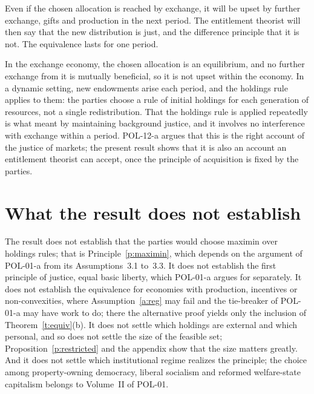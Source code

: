 \documentclass{situationist-preprint}
\begin{document}
\begin{objection}
Even if the chosen allocation is reached by exchange, it will be upset by further exchange, gifts and production in the next period. The entitlement theorist will then say that the new distribution is just, and the difference principle that it is not. The equivalence lasts for one period.
\end{objection}

\begin{reply}
In the exchange economy, the chosen allocation is an equilibrium, and no further exchange from it is mutually beneficial, so it is not upset within the economy. In a dynamic setting, new endowments arise each period, and the holdings rule applies to them: the parties choose a rule of initial holdings for each generation of resources, not a single redistribution. That the holdings rule is applied repeatedly is what \citet{Rawls1977} meant by maintaining background justice, and it involves no interference with exchange within a period. POL-12-a argues that this is the right account of the justice of markets; the present result shows that it is also an account an entitlement theorist can accept, once the principle of acquisition is fixed by the parties.
\end{reply}

\section{What the result does not establish}\label{s:not}

The result does not establish that the parties would choose maximin over holdings rules; that is Principle~\ref{p:maximin}, which depends on the argument of POL-01-a from its Assumptions~3.1 to~3.3. It does not establish the first principle of justice, equal basic liberty, which POL-01-a argues for separately. It does not establish the equivalence for economies with production, incentives or non-convexities, where Assumption~\ref{a:reg} may fail and the tie-breaker of POL-01-a may have work to do; there the alternative proof yields only the inclusion of Theorem~\ref{t:equiv}(b). It does not settle which holdings are external and which personal, and so does not settle the size of the feasible set; Proposition~\ref{p:restricted} and the appendix show that the size matters greatly. And it does not settle which institutional regime realizes the principle; the choice among property-owning democracy, liberal socialism and reformed welfare-state capitalism belongs to Volume~II of POL-01.
\end{document}
